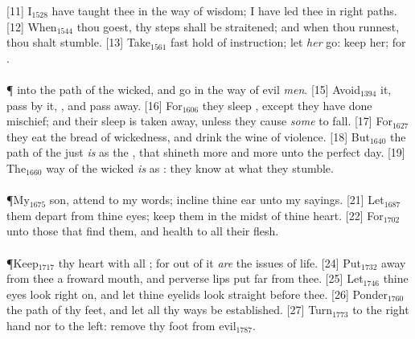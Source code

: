 [11] \textcolor[cmyk]{0.99998,1,0,0}{I\textcolor{jungle}{$_{1528}$} have taught thee in the way of wisdom; I have led thee in right paths.}
[12] \textcolor[cmyk]{0.99998,1,0,0}{When\textcolor{jungle}{$_{1544}$} thou goest, thy steps shall  be straitened; and when thou runnest, thou shalt  stumble.}
[13] \textcolor[cmyk]{0.99998,1,0,0}{Take\textcolor{jungle}{$_{1561}$} fast hold of instruction; let \emph{her}  go: keep her; for .}\\
\\
\P \textcolor[cmyk]{0.99998,1,0,0}{ into the path of the wicked, and go  in the way of evil \emph{men}.}
[15] \textcolor[cmyk]{0.99998,1,0,0}{Avoid\textcolor{jungle}{$_{1394}$} it, pass  by it, , and pass away.}
[16] \textcolor[cmyk]{0.99998,1,0,0}{For\textcolor{jungle}{$_{1606}$} they sleep , except they have done mischief; and their sleep is taken away, unless they cause \emph{some} to fall.}
[17] \textcolor[cmyk]{0.99998,1,0,0}{For\textcolor{jungle}{$_{1627}$} they eat the bread of wickedness, and drink the wine of violence.}
[18] \textcolor[cmyk]{0.99998,1,0,0}{But\textcolor{jungle}{$_{1640}$} the path of the just \emph{is} as the , that shineth more and more unto the perfect day.}
[19] \textcolor[cmyk]{0.99998,1,0,0}{The\textcolor{jungle}{$_{1660}$} way of the wicked \emph{is} as : they know  at what they stumble.}\\
\\
\P \textcolor[cmyk]{0.99998,1,0,0}{My\textcolor{jungle}{$_{1675}$} son, attend to my words; incline thine ear unto my sayings.}
[21] \textcolor[cmyk]{0.99998,1,0,0}{Let\textcolor{jungle}{$_{1687}$} them  depart from thine eyes; keep them in the midst of thine heart.}
[22] \textcolor[cmyk]{0.99998,1,0,0}{For\textcolor{jungle}{$_{1702}$}  unto those that find them, and health to all their flesh.}\\
\\
\P \textcolor[cmyk]{0.99998,1,0,0}{Keep\textcolor{jungle}{$_{1717}$} thy heart with all ; for out of it \emph{are} the issues of life.}
[24] \textcolor[cmyk]{0.99998,1,0,0}{Put\textcolor{jungle}{$_{1732}$} away from thee a froward mouth, and perverse lips put far from thee.}
[25] \textcolor[cmyk]{0.99998,1,0,0}{Let\textcolor{jungle}{$_{1746}$} thine eyes look right on, and let thine eyelids look straight before thee.} 
[26] \textcolor[cmyk]{0.99998,1,0,0}{Ponder\textcolor{jungle}{$_{1760}$} the path of thy feet, and let all thy ways be established.}
[27] \textcolor[cmyk]{0.99998,1,0,0}{Turn\textcolor{jungle}{$_{1773}$}  to the right hand nor to the left: remove thy foot from evil\textcolor{jungle}{$_{1787}$}.}

